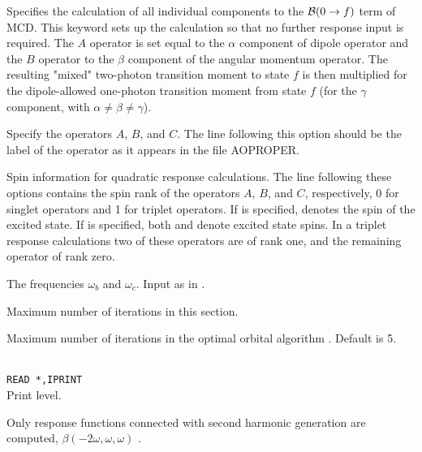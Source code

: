 \begin{description}
\item{}
Specifies the calculation of all individual components to the 
${\cal{B}}(0\to f)$ term of 
MCD.
This keyword sets up the calculation so that no further response input is required. 
The $A$ operator is set equal to the $\alpha$ component of dipole 
operator and
the $B$ operator to the $\beta$ component of the angular momentum
operator. The resulting "mixed" two-photon transition moment to state $f$ 
is then multiplied for the dipole-allowed one-photon transition moment 
from state $f$ (for the $\gamma$ component, with $\alpha \neq \beta \neq \gamma$).
\cite{Coriani:MCDRSP} 

\item[\Key{APROP}, \Key{BPROP}, \Key{CPROP}]
Specify the operators $A$, $B$, and $C$. The line following this
option should be the label of the operator as it appears in the file
AOPROPER.

\item[\Key{ASPIN}, \Key{BSPIN}, \Key{CSPIN}]
Spin information for quadratic response calculations.
The line following these options contains the spin rank of the operators 
$A$, $B$, and $C$, respectively, 0 for singlet operators and 1 for triplet
operators. If  is specified,  denotes the
spin of the excited state. If  is specified,
both  and  denote excited state spins.
In a triplet response calculations two of these operators are of rank one,
and the remaining operator of rank zero.


\item[\Key{BFREQ}, \Key{CFREQ}]
The frequencies $\omega_b$ and $\omega_c$. Input as in
.

\item{}
Maximum number of iterations in this section.

\item{}
Maximum number of iterations in the optimal orbital algorithm 
\cite{tuhjahjajpjjcp84}. 
Default is 5.

\item{}\\
\verb|READ *,IPRINT|\\
Print level.

\item{}
Only response functions connected with second harmonic
generation 
are computed, $\beta(-2\omega,\omega,\omega)$ .


\end{description}
